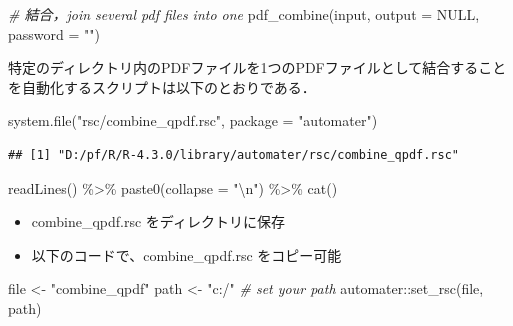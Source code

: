 \documentclass[
]{article}
\newenvironment{Shaded}{\begin{snugshade}}{\end{snugshade}}
\newcommand{\AttributeTok}[1]{\textcolor[rgb]{0.77,0.63,0.00}{#1}}
\newcommand{\CommentTok}[1]{\textcolor[rgb]{0.56,0.35,0.01}{\textit{#1}}}
\newcommand{\ConstantTok}[1]{\textcolor[rgb]{0.00,0.00,0.00}{#1}}
\newcommand{\FunctionTok}[1]{\textcolor[rgb]{0.00,0.00,0.00}{#1}}
\newcommand{\NormalTok}[1]{#1}
\newcommand{\OtherTok}[1]{\textcolor[rgb]{0.56,0.35,0.01}{#1}}
\newcommand{\SpecialCharTok}[1]{\textcolor[rgb]{0.00,0.00,0.00}{#1}}
\newcommand{\StringTok}[1]{\textcolor[rgb]{0.31,0.60,0.02}{#1}}
\providecommand{\tightlist}{%
  \setlength{\itemsep}{0pt}\setlength{\parskip}{0pt}}
\begin{document}
\begin{Shaded}
\begin{Highlighting}[]
  \CommentTok{\# 結合，join several pdf files into one}
\FunctionTok{pdf\_combine}\NormalTok{(input, }\AttributeTok{output =} \ConstantTok{NULL}\NormalTok{, }\AttributeTok{password =} \StringTok{""}\NormalTok{)}
\end{Highlighting}
\end{Shaded}

特定のディレクトリ内のPDFファイルを1つのPDFファイルとして結合することを自動化するスクリプトは以下のとおりである．

\begin{Shaded}
\begin{Highlighting}[]
\FunctionTok{system.file}\NormalTok{(}\StringTok{"rsc/combine\_qpdf.rsc"}\NormalTok{, }\AttributeTok{package =} \StringTok{"automater"}\NormalTok{)}
\end{Highlighting}
\end{Shaded}

\begin{verbatim}
## [1] "D:/pf/R/R-4.3.0/library/automater/rsc/combine_qpdf.rsc"
\end{verbatim}

\begin{Shaded}
\begin{Highlighting}[]
  \FunctionTok{readLines}\NormalTok{() }\SpecialCharTok{\%\textgreater{}\%}
  \FunctionTok{paste0}\NormalTok{(}\AttributeTok{collapse =} \StringTok{"}\SpecialCharTok{\textbackslash{}n}\StringTok{"}\NormalTok{) }\SpecialCharTok{\%\textgreater{}\%}
  \FunctionTok{cat}\NormalTok{()}
\end{Highlighting}
\end{Shaded}

\begin{itemize}
\tightlist
\item
  combine\_qpdf.rsc をディレクトリに保存\\
\item
  以下のコードで、combine\_qpdf.rsc をコピー可能
\end{itemize}

\begin{Shaded}
\begin{Highlighting}[]
\NormalTok{file }\OtherTok{\textless{}{-}} \StringTok{"combine\_qpdf"}
\NormalTok{path }\OtherTok{\textless{}{-}} \StringTok{"c:/"} \CommentTok{\# set your path}
\NormalTok{automater}\SpecialCharTok{::}\FunctionTok{set\_rsc}\NormalTok{(file, path)}
\end{Highlighting}
\end{Shaded}
\end{document}
